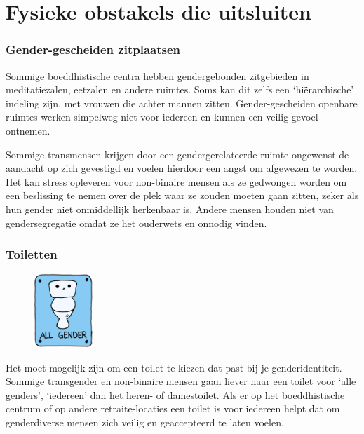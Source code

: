 \documentclass[12pt,openany]{book}
\begin{document}
\section*{Fysieke obstakels die uitsluiten}

\subsubsection*{Gender-gescheiden zitplaatsen}

Sommige boeddhistische centra hebben gendergebonden zitgebieden in meditatiezalen, eetzalen en andere ruimtes. Soms kan dit zelfs een `hiërarchische' indeling zijn, met vrouwen die achter mannen zitten. Gender-gescheiden openbare ruimtes werken simpelweg niet voor iedereen en kunnen een veilig gevoel ontnemen. 

Sommige transmensen krijgen door een gendergerelateerde ruimte ongewenst de aandacht op zich gevestigd en voelen hierdoor een angst om afgewezen te worden. Het kan stress opleveren voor non-binaire mensen als ze gedwongen worden om een beslissing te nemen over de plek waar ze zouden moeten gaan zitten, zeker als hun gender niet onmiddellijk herkenbaar is. Andere mensen houden niet van gendersegregatie omdat ze het ouderwets en onnodig vinden.

\subsubsection*{Toiletten}

\begin{figure}
    \centering
    \includegraphics[width=0.2\textwidth]{16.png}
\end{figure}
Het moet mogelijk zijn om een toilet te kiezen dat past bij je genderidentiteit. Sommige transgender en non-binaire mensen gaan liever naar een toilet voor `alle genders', `iedereen' dan het heren- of damestoilet. Als er op het boeddhistische centrum of op andere retraite-locaties een toilet is voor iedereen helpt dat om genderdiverse mensen zich veilig en geaccepteerd te laten voelen.
\end{document}
